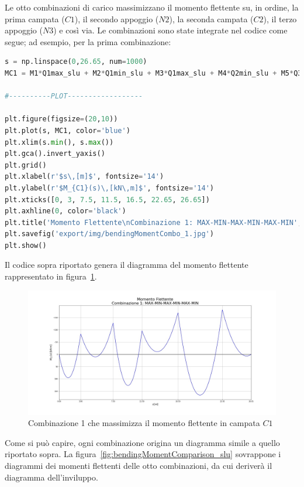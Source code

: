  Le otto combinazioni di carico massimizzano il momento flettente su, in ordine, la prima campata ($C1$), il secondo appoggio ($N2$), la seconda campata ($C2$), il terzo appoggio ($N3$) e così via. Le combinazioni sono state integrate nel codice come segue; ad esempio, per la prima combinazione:
 \cleardoublepage
 \begin{lstlisting}[language=Python]
s = np.linspace(0,26.65, num=1000)
MC1 = M1*Q1max_slu + M2*Q1min_slu + M3*Q1max_slu + M4*Q2min_slu + M5*Q3max_slu + M6*Q3min_slu

#----------PLOT------------------

plt.figure(figsize=(20,10))
plt.plot(s, MC1, color='blue')
plt.xlim(s.min(), s.max())
plt.gca().invert_yaxis()
plt.grid()
plt.xlabel(r'$s\,[m]$', fontsize='14')
plt.ylabel(r'$M_{C1}(s)\,[kN\,m]$', fontsize='14')
plt.xticks([0, 3, 7.5, 11.5, 16.5, 22.65, 26.65])
plt.axhline(0, color='black')
plt.title('Momento Flettente\nCombinazione 1: MAX-MIN-MAX-MIN-MAX-MIN', fontsize='22')
plt.savefig('export/img/bendingMomentCombo_1.jpg')
plt.show()
 \end{lstlisting}
 \noindent
Il codice sopra riportato genera il diagramma del momento flettente rappresentato in figura~\ref{fig:bendingMomentCombo_1}.
 
 \begin{figure}
 	\centering
 	\includegraphics[width=\textwidth]{../../export/img/bendingMomentCombo_1}
 	\caption{Combinazione 1 che massimizza il momento flettente in campata $C1$}
 	\label{fig:bendingMomentCombo_1}
 \end{figure}

 Come si può capire, ogni combinazione origina un diagramma simile a quello riportato sopra. La figura~\ref{fig:bendingMomentComparison_slu} sovrappone i diagrammi dei momenti flettenti delle otto combinazioni, da cui deriverà il diagramma dell'inviluppo.
 
